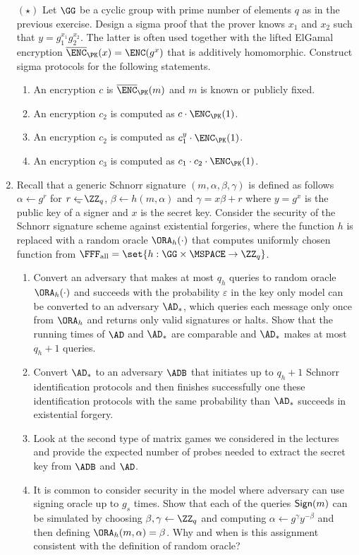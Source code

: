 \documentclass{article}
\newcommand{\FALL}{\FFF_{\mathrm{all}}}
\begin{document}
\begin{enumerate}
\item[$(\star)$] Let $\GG$ be a cyclic group with prime number of
  elements $q$ as in the previous exercise. Design a sigma proof that
  the prover knows $x_1$ and $x_2$ such that
  $y=g_1^{x_1}g_2^{x_2}$. The latter is often used together with the
  lifted ElGamal encryption $\overline{\ENC}_\PK(x)=\ENC(g^x)$ that is
  additively homomorphic. Construct sigma protocols for the following
  statements.
  \begin{enumerate}
  \item An encryption $c$  is $\overline{\ENC}_\PK(m)$ and $m$ is known or publicly fixed.
  \item An encryption $c_2$ is computed as $c\cdot\ENC_\PK(1)$.
  \item An encryption $c_2$ is computed as $c_1^y\cdot \ENC_\PK(1)$.
  \item An encryption $c_3$ is computed as $c_1\cdot c_2\cdot \ENC_\PK(1)$.
  \end{enumerate}

\item Recall that a generic Schnorr signature
  $(m,\alpha,\beta,\gamma)$ is defined as follows $\alpha\gets g^r$
  for $r\getsu \ZZ_q$, $\beta\gets h(m,\alpha)$ and $\gamma=x\beta+r$
  where $y=g^x$ is the public key of a signer and $x$ is the secret
  key. Consider the security of the Schnorr signature scheme against
  existential forgeries, where the function $h$ is replaced with a
  random oracle $\ORA_h(\cdot)$ that computes uniformly chosen
  function from $\FALL=\set{h:\GG\times\MSPACE\to\ZZ_q}$.  
  \begin{enumerate}
  \item Convert an adversary that makes at most $q_h$ queries to
    random oracle $\ORA_h(\cdot)$ and succeeds with the probability
    $\varepsilon$ in the key only model can be converted to an
    adversary $\AD_*$, which queries each message only once from
    $\ORA_h$ and returns only valid signatures or halts. Show that the
    running times of $\AD$ and $\AD_*$ are comparable and $\AD_*$
    makes at most $q_h+1$ queries.
  \item Convert $\AD_*$ to an adversary $\ADB$ that initiates up to
    $q_h+1$ Schnorr identification protocols and then finishes
    successfully one these identification protocols with the same
    probability than $\AD_*$ succeeds in existential forgery.
  \item Look at the second type of matrix games we considered in the
    lectures and provide the expected number of probes needed to
    extract the secret key from $\ADB$ and $\AD$.

  \item It is common to consider security in the model where adversary
    can use signing oracle up to $g_s$ times. Show that each of the
    queries $\mathsf{Sign}(m)$ can be simulated by choosing
    $\beta,\gamma\gets\ZZ_q$ and computing $\alpha\gets g^\gamma
    y^{-\beta}$ and then defining $\ORA_h(m,\alpha)=\beta$. Why and
    when is this assignment consistent with the definition of random
    oracle?
 \end{enumerate}

\end{enumerate}
\end{document}
